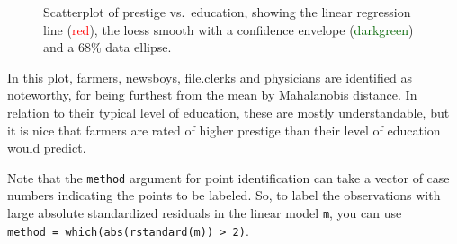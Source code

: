 \documentclass[
  letterpaper,
  10pt,
  krantz2]{krantz}
\begin{document}
\begin{figure}


\caption{\label{fig-Prestige-scatterplot-educ1}Scatterplot of prestige
vs.~education, showing the linear regression line
(\textcolor{red}{red}), the loess smooth with a confidence envelope
(\textcolor{darkgreen}{darkgreen}) and a 68\% data ellipse.}

\end{figure}%

In this plot, farmers, newsboys, file.clerks and physicians are
identified as noteworthy, for being furthest from the mean by
Mahalanobis distance. In relation to their typical level of education,
these are mostly understandable, but it is nice that farmers are rated
of higher prestige than their level of education would predict.

Note that the \texttt{method} argument for point identification can take
a vector of case numbers indicating the points to be labeled. So, to
label the observations with large absolute standardized residuals in the
linear model \texttt{m}, you can use
\texttt{method\ =\ which(abs(rstandard(m))\ \textgreater{}\ 2)}.
\end{document}
